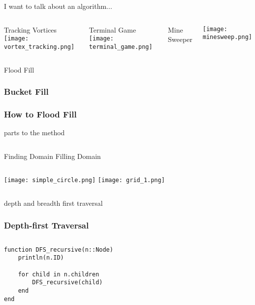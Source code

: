 \documentclass{beamer}
\begin{document}
\begin{frame}
\center \Huge{I want to talk about an algorithm...}
\end{frame}

\begin{frame}
\begin{columns}

\center Tracking Vortices
\texttt{[image: vortex\_tracking.png]}



\center Terminal Game
\texttt{[image: terminal\_game.png]}

\vspace{0.5cm}

\center Mine Sweeper

\texttt{[image: minesweep.png]}
\end{columns}
\end{frame}


\begin{frame}
\center \Huge Flood Fill
\end{frame}

\begin{frame}
\frametitle{Bucket Fill}
\end{frame}

\begin{frame}
\frametitle{How to Flood Fill}
 parts to the method

\begin{columns}
\center Finding Domain
\center Filling Domain
\end{columns}
\begin{columns}
\texttt{[image: simple\_circle.png]}
\vspace{-0.5cm}
\center \texttt{[image: grid\_1.png]}
\end{columns}
\center depth and breadth first traversal
\end{frame}

\begin{frame}[fragile]
\frametitle{Depth-first Traversal}
\begin{columns}
\begin{lstlisting}
function DFS_recursive(n::Node)
    println(n.ID)

    for child in n.children
        DFS_recursive(child)
    end
end
\end{lstlisting}
\end{columns}
\end{frame}
\end{document}
